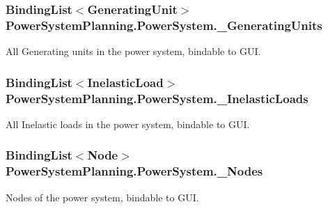 \subsubsection[{\texorpdfstring{\+\_\+\+Generating\+Units}{_GeneratingUnits}}]{\setlength{\rightskip}{0pt plus 5cm}Binding\+List$<${\bf Generating\+Unit}$>$ Power\+System\+Planning.\+Power\+System.\+\_\+\+Generating\+Units}\hypertarget{class_power_system_planning_1_1_power_system_af58aafa6a09ec68a492ea650e587ee36}{}\label{class_power_system_planning_1_1_power_system_af58aafa6a09ec68a492ea650e587ee36}


All Generating units in the power system, bindable to G\+UI. 

\subsubsection[{\texorpdfstring{\+\_\+\+Inelastic\+Loads}{_InelasticLoads}}]{\setlength{\rightskip}{0pt plus 5cm}Binding\+List$<${\bf Inelastic\+Load}$>$ Power\+System\+Planning.\+Power\+System.\+\_\+\+Inelastic\+Loads}\hypertarget{class_power_system_planning_1_1_power_system_a00de0d9b9439f8b3ec25b1ac020a503d}{}\label{class_power_system_planning_1_1_power_system_a00de0d9b9439f8b3ec25b1ac020a503d}


All Inelastic loads in the power system, bindable to G\+UI. 

\subsubsection[{\texorpdfstring{\+\_\+\+Nodes}{_Nodes}}]{\setlength{\rightskip}{0pt plus 5cm}Binding\+List$<${\bf Node}$>$ Power\+System\+Planning.\+Power\+System.\+\_\+\+Nodes}\hypertarget{class_power_system_planning_1_1_power_system_afe8041cf92b81053ffc54c1ab2cd76cc}{}\label{class_power_system_planning_1_1_power_system_afe8041cf92b81053ffc54c1ab2cd76cc}


Nodes of the power system, bindable to G\+UI. 

